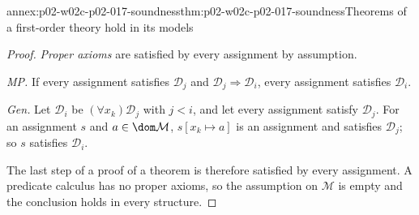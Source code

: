 \begin{annexitem}{annex:p02-w02c-p02-017-soundness}{thm:p02-w02c-p02-017-soundness}{Theorems of a first-order theory hold in its models}
\begin{proof}
\emph{Proper axioms} are satisfied by every assignment by assumption.

\emph{MP.}  If every assignment satisfies \(\mathscr D_j\) and
\(\mathscr D_j\Rightarrow\mathscr D_i\), every assignment satisfies
\(\mathscr D_i\).

\emph{Gen.}  Let \(\mathscr D_i\) be \((\forall x_k)\mathscr D_j\) with
\(j<i\), and let every assignment satisfy \(\mathscr D_j\).  For an
assignment \(s\) and \(a\in\dom\mathcal M\), \(s[x_k\mapsto a]\) is an
assignment and satisfies \(\mathscr D_j\); so \(s\) satisfies
\(\mathscr D_i\).

The last step of a proof of a theorem is therefore satisfied by every
assignment.  A predicate calculus has no proper axioms, so the assumption on
\(\mathcal M\) is empty and the conclusion holds in every structure.
\end{proof}
\end{annexitem}

